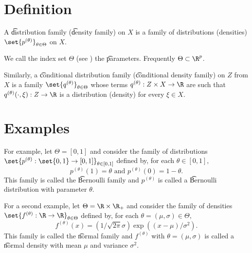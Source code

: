 

\section*{Definition}

A \t{distribution family} (\t{density family}) on $X$ is a family of distributions (densities) $\set{p^{(\theta )}}_{\theta  \in \Theta }$ on $X$.

We call the index set $\Theta $ (see ) the \t{parameters}.
Frequently $\Theta  \subset \R ^p$.

Similarly, a \t{conditional distribution family} (\t{conditional density family}) on $Z$ from $X$ is a family $\set{q^{(\theta )}}_{\theta  \in \Theta }$ whose terms $q^{(\theta )}: Z \times X \to \R $ are such that $q^{(\theta )}(\cdot , \xi ): Z \to \R $ is a distribution (density) for every $\xi  \in X$.

\section*{Examples}

For example, let $\Theta  = [0, 1]$ and consider the family of distributions $\set{p^{(\theta )}: \set{0, 1} \to [0,1]}_{\theta \in [0,1]}$ defined by, for each $\theta  \in [0,1]$,
    \[
p^{(\theta )}(1) = \theta  \text{ and } p^{(\theta )}(0) = 1-\theta .
    \]
This family is called the \t{Bernoulli family} and $p^{(\theta )}$ is called a \t{Bernoulli distribution} with parameter $\theta $.

For a second example, let $\Theta  = \R  \times \R _{+}$ and consider the family of densities $\set{f^{(\theta )}: \R  \to \R }_{\theta  \in \Theta }$ defined by, for each $\theta  = (\mu , \sigma ) \in \Theta ,$
    \[
f^{(\theta )}(x) = (1/\sqrt{2\pi }\sigma )\exp((x - \mu )/\sigma ^2).
    \]
This family is called the \t{normal family} and $f^{(\theta )}$ with $\theta  = (\mu , \sigma )$ is called a \t{normal density} with mean $\mu $ and variance $\sigma ^2$.

